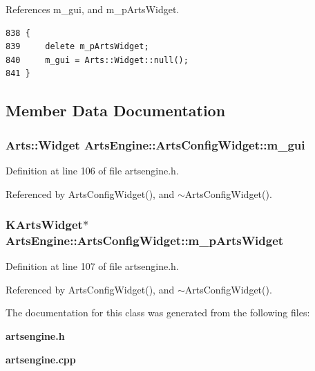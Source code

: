 References m\_\-gui, and m\_\-p\-Arts\-Widget.



\footnotesize\begin{verbatim}838 {
839     delete m_pArtsWidget;
840     m_gui = Arts::Widget::null();
841 }
\end{verbatim}\normalsize 


\subsection{Member Data Documentation}
\subsubsection{\setlength{\rightskip}{0pt plus 5cm}Arts::Widget {\bf Arts\-Engine::Arts\-Config\-Widget::m\_\-gui}\hspace{0.3cm}{\tt  [private]}}\label{classArtsEngine_1_1ArtsConfigWidget_ArtsEngine_1_1ArtsConfigWidgetr0}




Definition at line 106 of file artsengine.h.

Referenced by Arts\-Config\-Widget(), and $\sim$Arts\-Config\-Widget().
\subsubsection{\setlength{\rightskip}{0pt plus 5cm}KArts\-Widget$\ast$ {\bf Arts\-Engine::Arts\-Config\-Widget::m\_\-p\-Arts\-Widget}\hspace{0.3cm}{\tt  [private]}}\label{classArtsEngine_1_1ArtsConfigWidget_ArtsEngine_1_1ArtsConfigWidgetr1}




Definition at line 107 of file artsengine.h.

Referenced by Arts\-Config\-Widget(), and $\sim$Arts\-Config\-Widget().

The documentation for this class was generated from the following files:\begin{CompactItemize}
\item 
{\bf artsengine.h}\item 
{\bf artsengine.cpp}\end{CompactItemize}
